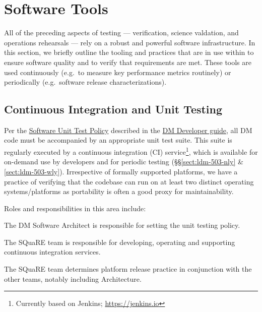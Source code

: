\section{Software Tools}
\label{sect:tools}

All of the preceding aspects of testing --- verification, science valdation, and operations rehearsals --- rely on a robust and powerful software infrastructure.
In this section, we briefly outline the tooling and practices that are in use
within \product{} to ensure software quality and to verify that requirements are met.
These tools are used continuously (e.g.\ to measure key performance metrics routinely) or periodically (e.g.\ software release characterizations).

\subsection{Continuous Integration and Unit Testing}

Per the \href{https://developer.lsst.io/coding/unit-test-policy.html}{Software Unit Test Policy} described in the \href{https://developer.lsst.io}{DM Developer guide}, all DM code must be accompanied by an appropriate unit test suite.
This suite is regularly executed by a continuous integration (CI) service\footnote{Currently based on Jenkins; \url{https://jenkins.io}}, which is available for on-demand use by developers and for periodic testing (\S\S \ref{sect:ldm-503-nly} \& \ref{sect:ldm-503-wly}).
Irrespective of formally supported platforms, we have a practice of verifying that the codebase can run on at least two distinct operating systems/platforms as portability is often a good proxy for maintainability.

Roles and responsibilities in this area include:

\begin{itemize_single}

\item{The DM Software Architect is responsible for setting the unit testing policy.}

\item{The SQuaRE team is responsible for developing, operating and supporting continuous integration services.}

\item{The SQuaRE team determines platform release practice in conjunction with the other teams, notably including Architecture.}

\end{itemize_single}

